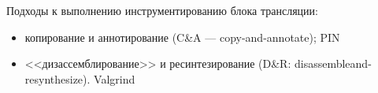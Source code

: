 Подходы к выполнению инструментированию блока трансляции:
\begin{itemize}
    \item копирование и аннотирование (C\&A — copy-and-annotate); PIN
    \item <<дизассемблирование>> и ресинтезирование (D\&R: disassembleand-resynthesize). Valgrind
\end{itemize}